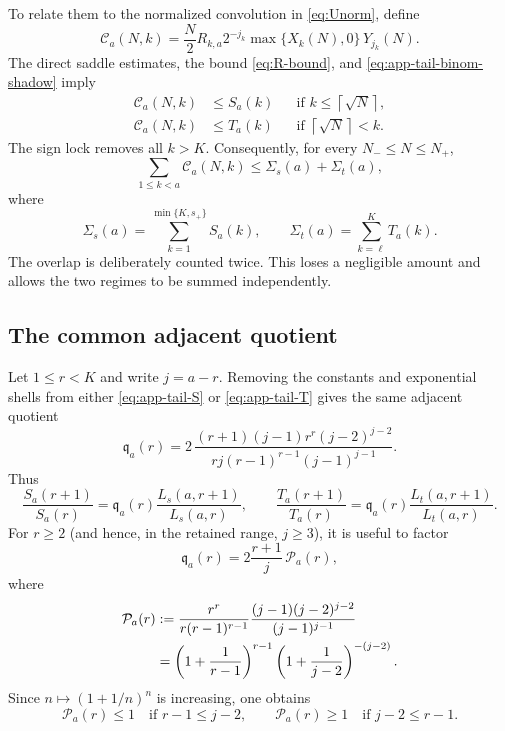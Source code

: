 \documentclass[11pt]{article}
\theoremstyle{definition}
\theoremstyle{remark}
\newcommand{\ceil}[1]{\left\lceil #1\right\rceil}
\begin{document}
To relate them to the normalized convolution in \eqref{eq:Unorm}, define
\begin{equation}\label{eq:app-tail-C}
 \mathcal C_a(N,k)=
 \frac N2 R_{k,a}2^{-j_k}\max\{X_k(N),0\}\,Y_{j_k}(N).
\end{equation}
The direct saddle estimates, the bound \eqref{eq:R-bound}, and
\eqref{eq:app-tail-binom-shadow} imply
\begin{align}
 \mathcal C_a(N,k)&\le S_a(k)
 &&\text{if }k\le\ceil{\sqrt N},
 \label{eq:app-tail-pointwise-small}\\
 \mathcal C_a(N,k)&\le T_a(k)
 &&\text{if }\ceil{\sqrt N}<k.
 \label{eq:app-tail-pointwise-temp}
\end{align}
The sign lock removes all $k>K$.  Consequently, for every
$N_-\le N\le N_+$,
\begin{equation}\label{eq:app-tail-product-to-two-sums}
 \sum_{1\le k<a}\mathcal C_a(N,k)
 \le \Sigma_s(a)+\Sigma_t(a),
\end{equation}
where
\begin{equation}\label{eq:app-tail-sums}
 \Sigma_s(a)=\sum_{k=1}^{\min\{K,s_+\}}S_a(k),
 \qquad
 \Sigma_t(a)=\sum_{k=\ell}^{K}T_a(k).
\end{equation}
The overlap is deliberately counted twice.  This loses a negligible amount
and allows the two regimes to be summed independently.

\subsection{The common adjacent quotient}

Let $1\le r<K$ and write $j=a-r$.  Removing the constants and exponential
shells from either \eqref{eq:app-tail-S} or \eqref{eq:app-tail-T} gives the
same adjacent quotient
\begin{equation}\label{eq:app-tail-qraw}
 \mathfrak q_a(r)=
 2\,
 \frac{(r+1)(j-1)r^r(j-2)^{j-2}}
 {rj(r-1)^{r-1}(j-1)^{j-1}}.
\end{equation}
Thus
\begin{equation}\label{eq:app-tail-ratio-exact}
 \frac{S_a(r+1)}{S_a(r)}
  =\mathfrak q_a(r)\frac{L_s(a,r+1)}{L_s(a,r)},
 \qquad
 \frac{T_a(r+1)}{T_a(r)}
  =\mathfrak q_a(r)\frac{L_t(a,r+1)}{L_t(a,r)}.
\end{equation}
For $r\ge2$ (and hence, in the retained range, $j\ge3$), it is useful to factor
\begin{equation}\label{eq:app-tail-P-factor}
 \mathfrak q_a(r)=2\frac{r+1}{j}\,\mathcal P_a(r),
\end{equation}
where
\begin{align}
 \mathcal P_a(r)
 &:=\frac{r^r}{r(r-1)^{r-1}}
 \frac{(j-1)(j-2)^{j-2}}{(j-1)^{j-1}}
 \notag\\
 &=\left(1+\frac1{r-1}\right)^{r-1}
   \left(1+\frac1{j-2}\right)^{-(j-2)}.
 \label{eq:app-tail-P}
\end{align}
Since $n\mapsto(1+1/n)^n$ is increasing, one obtains
\begin{equation}\label{eq:app-tail-P-directions}
 \mathcal P_a(r)\le1\quad\text{if }r-1\le j-2,
 \qquad
 \mathcal P_a(r)\ge1\quad\text{if }j-2\le r-1.
\end{equation}
\end{document}
